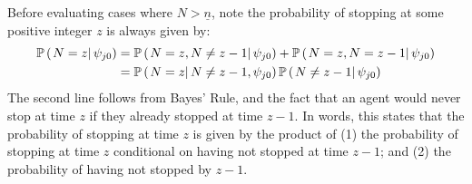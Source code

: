 \documentclass[11 pt]{article}
\newcommand{\pr}[1]{\left( #1 \right)}
\newcommand{\cls}[2]{\left. #1 \right\vert #2}
\begin{document}
Before evaluating cases where $N > \underline{n}$, note the probability of stopping at some positive integer $z$ is always given by:
\begin{align*}
    \PP \pr{\cls{N = z}{\psi_{j0}}} 
    &=
    \PP \pr{\cls{N = z, N \neq z - 1}{\psi_{j0}}}
    +
    \PP \pr{\cls{N = z, N = z - 1}{\psi_{j0}}}
    \\
    &=
    \PP \pr{\cls{N = z}{N \neq z - 1, \psi_{j0}}}
    \PP \pr{\cls{N \neq z - 1}{\psi_{j0}}}
\end{align*}
The second line follows from Bayes' Rule, and the fact that an agent would never stop at time $z$ if they already stopped at time $z-1$.
In words, this states that the probability of stopping at time $z$ is given by the product of (1) the probability of stopping at time $z$ conditional on having not stopped at time $z-1$; and (2) the probability of having not stopped by $z-1$.
\end{document}
